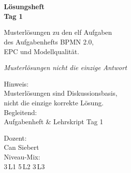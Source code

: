 \documentclass[11pt,a4paper,oneside]{article}
\newcommand{\caveatfontfallback}{\itshape}
\newcommand\caveatfont{\caveatfontfallback}%
\begin{document}
\begin{titlepage}
  \pagestyle{empty}
  \vspace*{1.5cm}
  \\[2pt]
  \noindent{\color{lpAccent}\rule{\linewidth}{1.2pt}}\\[4pt]

  \vspace{3cm}
  {\sffamily\fontsize{30}{34}\selectfont\bfseries\color{lpInk}L\"osungsheft\\Tag 1\par}

  \vspace{0.7cm}
  {\sffamily\large\color{lpGray}Musterl\"osungen zu den elf Aufgaben\\des Aufgabenhefts \textendash{} BPMN 2.0,\\EPC und Modellqualit\"at.\par}

  \vspace{1.5cm}
  {\caveatfont\LARGE\color{lpGreen}Musterl\"osungen \textperiodcentered{} nicht die einzige Antwort}\par

  \vfill

  \noindent\begin{minipage}{0.55\linewidth}
    {\sffamily\footnotesize\color{lpGray}Hinweis:}\\
    {\sffamily\small\color{lpInk}Musterl\"osungen sind Diskussionsbasis,\\nicht die einzige korrekte L\"osung.}\\[10pt]
    {\sffamily\footnotesize\color{lpGray}Begleitend:}\\
    {\sffamily\small\color{lpInk}Aufgabenheft \& Lehrskript Tag 1}
  \end{minipage}\hfill
  \begin{minipage}{0.4\linewidth}
    \raggedleft
    {\sffamily\footnotesize\color{lpGray}Dozent:}\\
    {\sffamily\small\color{lpInk}Can Siebert}\\[10pt]
    {\sffamily\footnotesize\color{lpGray}Niveau-Mix:}\\
    {\sffamily\small\color{lpInk}3\,L1 \textperiodcentered{} 5\,L2 \textperiodcentered{} 3\,L3}
  \end{minipage}

  \vspace{0.5cm}
  \noindent{\color{lpAccent}\rule{\linewidth}{0.6pt}}
\end{titlepage}
\end{document}
